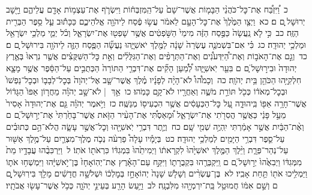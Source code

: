 \documentclass[18pt]{article}
\begin{document}
 {\loc כ~}וַ֠יִּזְבַּ֠ח אֶת־כׇּל־כֹּהֲנֵ֨י הַבָּמ֤וֹת אֲשֶׁר־שָׁם֙ עַל־הַֽמִּזְבְּח֔וֹת וַיִּשְׂרֹ֛ף אֶת־עַצְמ֥וֹת אָדָ֖ם עֲלֵיהֶ֑ם וַיָּ֖שׇׁב יְרוּשָׁל ָֽ͏ְם ם׃ \startlock
 {\loc כא~}וַיְצַ֤ו הַמֶּ֙לֶךְ֙ אֶת־כׇּל־הָעָ֣ם לֵאמֹ֔ר עֲשׂ֣וּ פֶ֔סַח לַיהֹוָ֖ה אֱלֹהֵיכֶ֑ם כַּכָּת֕וּב עַ֛ל סֵ֥פֶר הַבְּרִ֖ית הַזֶּֽה׃ \startlock
 {\loc כב~}כִּ֣י לֹ֤א נַֽעֲשָׂה֙ כַּפֶּ֣סַח הַזֶּ֔ה מִימֵי֙ הַשֹּׁ֣פְטִ֔ים אֲשֶׁ֥ר שָׁפְט֖וּ אֶת־יִשְׂרָאֵ֑ל וְכֹ֗ל יְמֵ֛י מַלְכֵ֥י יִשְׂרָאֵ֖ל וּמַלְכֵ֥י יְהוּדָֽה׃ \startlock
 {\loc כג~}כִּ֗י אִם־בִּשְׁמֹנֶ֤ה עֶשְׂרֵה֙ שָׁנָ֔ה לַמֶּ֖לֶךְ יֹאשִׁיָּ֑הוּ נַעֲשָׂ֞ה הַפֶּ֧סַח הַזֶּ֛ה לַיהֹוָ֖ה בִּירוּשָׁל ָֽ͏ְם ם׃ \startlock
 {\loc כד~}וְגַ֣ם אֶת־הָאֹב֣וֹת וְאֶת־הַ֠יִּדְּעֹנִ֠ים וְאֶת־הַתְּרָפִ֨ים וְאֶת־הַגִּלֻּלִ֜ים וְאֵ֣ת כׇּל־הַשִּׁקֻּצִ֗ים אֲשֶׁ֤ר נִרְאוּ֙ בְּאֶ֤רֶץ יְהוּדָה֙ וּבִיר֣וּשָׁל ַ֔͏ְם ם בִּעֵ֖ר יֹֽאשִׁיָּ֑הוּ לְ֠מַ֠עַן הָקִ֞ים אֶת־דִּבְרֵ֤י הַתּוֹרָה֙ הַכְּתֻבִ֣ים עַל־הַסֵּ֔פֶר אֲשֶׁ֥ר מָצָ֛א חִלְקִיָּ֥הוּ הַכֹּהֵ֖ן בֵּ֥ית יְהֹוָֽה׃ \startlock
 {\loc כה~}וְכָמֹ֩הוּ֩ לֹא־הָיָ֨ה לְפָנָ֜יו מֶ֗לֶךְ אֲשֶׁר־שָׁ֤ב אֶל־יְהֹוָה֙ בְּכׇל־לְבָב֤וֹ וּבְכׇל־נַפְשׁוֹ֙ וּבְכׇל־מְאֹד֔וֹ כְּכֹ֖ל תּוֹרַ֣ת מֹשֶׁ֑ה וְאַחֲרָ֖יו לֹא־קָ֥ם כָּמֹֽהוּ׃ \startlock
 {\loc כו~}אַ֣ךְ  |  לֹא־שָׁ֣ב יְהֹוָ֗ה מֵחֲר֤וֹן אַפּוֹ֙ הַגָּד֔וֹל אֲשֶׁר־חָרָ֥ה אַפּ֖וֹ בִּֽיהוּדָ֑ה עַ֚ל כׇּל־הַכְּעָסִ֔ים אֲשֶׁ֥ר הִכְעִיס֖וֹ מְנַשֶּֽׁה׃ \startlock
 {\loc כז~}וַיֹּ֣אמֶר יְהֹוָ֗ה גַּ֤ם אֶת־יְהוּדָה֙ אָסִיר֙ מֵעַ֣ל פָּנַ֔י כַּאֲשֶׁ֥ר הֲסִרֹ֖תִי אֶת־יִשְׂרָאֵ֑ל וּ֠מָאַסְתִּ֠י אֶת־הָעִ֨יר הַזֹּ֤את אֲשֶׁר־בָּחַ֙רְתִּי֙ אֶת־יְר֣וּשָׁל ַ֔͏ְם ם וְאֶ֨ת־הַבַּ֔יִת אֲשֶׁ֣ר אָמַ֔רְתִּי יִֽהְיֶ֥ה שְׁמִ֖י שָֽׁם׃ \startlock
 {\loc כח~}וְיֶ֛תֶר דִּבְרֵ֥י יֹֽאשִׁיָּ֖הוּ וְכׇל־אֲשֶׁ֣ר עָשָׂ֑ה הֲלֹא־הֵ֣ם כְּתוּבִ֗ים עַל־סֵ֛פֶר דִּבְרֵ֥י הַיָּמִ֖ים לְמַלְכֵ֥י יְהוּדָֽה׃ \startlock
 {\loc כט~}בְּיָמָ֡יו עָלָה֩ פַרְעֹ֨ה נְכֹ֧ה מֶלֶךְ־מִצְרַ֛יִם עַל־מֶ֥לֶךְ אַשּׁ֖וּר עַל־נְהַר־פְּרָ֑ת וַיֵּ֨לֶךְ הַמֶּ֤לֶךְ יֹאשִׁיָּ֙הוּ֙ לִקְרָאת֔וֹ וַיְמִיתֵ֙הוּ֙ בִּמְגִדּ֔וֹ כִּרְאֹת֖וֹ אֹתֽוֹ׃ \startlock
 {\loc ל~}וַיַּרְכִּבֻ֨הוּ עֲבָדָ֥יו מֵת֙ מִמְּגִדּ֔וֹ וַיְבִאֻ֙הוּ֙ יְר֣וּשָׁל ַ֔͏ְם ם וַֽיִּקְבְּרֻ֖הוּ בִּקְבֻרָת֑וֹ וַיִּקַּ֣ח עַם־הָאָ֗רֶץ אֶת־יְהֽוֹאָחָז֙ בֶּן־יֹ֣אשִׁיָּ֔הוּ וַיִּמְשְׁח֥וּ אֹת֛וֹ וַיַּמְלִ֥יכוּ אֹת֖וֹ תַּ֥חַת אָבִֽיו׃ \startlock
 {\loc לא~}בֶּן־עֶשְׂרִ֨ים וְשָׁלֹ֤שׁ שָׁנָה֙ יְהוֹאָחָ֣ז בְּמׇלְכ֔וֹ וּשְׁלֹשָׁ֣ה חֳדָשִׁ֔ים מָלַ֖ךְ בִּירֽוּשָׁל ָ֑͏ְם ם וְשֵׁ֣ם אִמּ֔וֹ חֲמוּטַ֥ל בַּֽת־יִרְמְיָ֖הוּ מִלִּבְנָֽה׃ \startlock
 {\loc לב~}וַיַּ֥עַשׂ הָרַ֖ע בְּעֵינֵ֣י יְהֹוָ֑ה כְּכֹ֥ל אֲשֶׁר־עָשׂ֖וּ אֲבֹתָֽיו׃ \startlock
\end{document}
